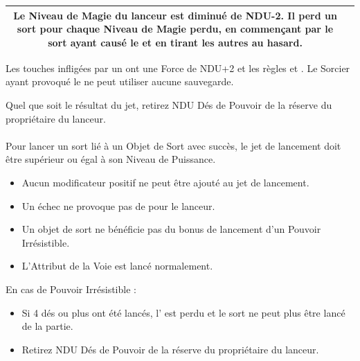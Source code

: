 {\begin{multicols}{2}
\begin{center}
\begin{tabular}{cm{6.75cm}@{}}
\vspace*{3pt}
Le Niveau de Magie du lanceur est diminué de NDU-2. Il perd un sort pour chaque Niveau de Magie perdu, en commençant par le sort ayant causé le \miscast{} et en tirant les autres au hasard.\tabularnewline
\hline
\end{tabular}
\end{center}

\vspace*{5pt}
\noindent Les touches infligées par un \miscast{} ont une Force de NDU+2 et les règles \magicalattacks{} et . Le Sorcier ayant provoqué le \miscast{} ne peut utiliser aucune sauvegarde.

\vspace*{5pt}
\noindent Quel que soit le résultat du jet, retirez NDU Dés de Pouvoir de la réserve du propriétaire du lanceur.

\vspace*{30pt}
\begin{framed}
\vspace*{-17pt}
\paragraph{\boundspells{}}

\noindent Pour lancer un sort lié à un Objet de Sort avec succès, le jet de lancement doit être supérieur ou égal à son Niveau de Puissance.
\begin{itemize}[label={-}]
\item Aucun modificateur positif ne peut être ajouté au jet de lancement.
\item Un échec ne provoque pas de \lostfocus{} pour le lanceur.
\item Un objet de sort ne bénéficie pas du bonus de lancement d'un Pouvoir Irrésistible.
\item L'Attribut de la Voie est lancé normalement.
\end{itemize}

\noindent En cas de Pouvoir Irrésistible :
\begin{itemize}[label={-}, itemsep=3pt]
\item Si 4 dés ou plus ont été lancés, l'\boundspell{} est perdu et le sort ne peut plus être lancé de la partie.
\item Retirez NDU Dés de Pouvoir de la réserve du propriétaire du lanceur.
\end{itemize}
\end{framed}

\vspace*{\fill}
\end{multicols}

}
